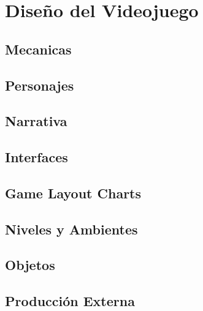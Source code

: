 \section{Diseño del Videojuego}

\subsection{Mecanicas}

\subsection{Personajes}

\subsection{Narrativa}

\subsection{Interfaces}

\subsection{Game Layout Charts}

\subsection{Niveles y Ambientes}

\subsection{Objetos}

\subsection{Producción Externa}